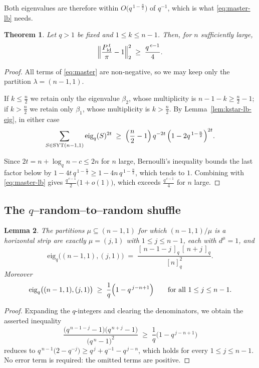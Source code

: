 \documentclass[11pt]{article}
\theoremstyle{plain}  %
\newtheorem{theorem}{Theorem}[section]
\newtheorem{lemma}[theorem]{Lemma}
\newcommand{\eig}{\text{eig}} %
\begin{document}
Both eigenvalues are therefore within $O\bigl(q^{\,1-\frac{n}{2}}\bigr)$ of $q^{-1}$, which is
what \eqref{eq:master-lb} needs.

\begin{theorem}\label{thm:kstar-lb}
Let $q>1$ be fixed and $1 \le k \le n-1$. Then, for $n$ sufficiently large,
$$
  \Bigl\|\frac{P^{\,t}_{\mathrm{id}}}{\pi}-1\Bigr\|_2^{2}
  \;\ge\; \frac{q^{\,c-1}}{4} .
$$
\end{theorem}



\begin{proof}
All terms of \eqref{eq:master} are non-negative, so we may keep only the
partition $\lambda = (n-1,1)$.

If $k \le \frac n2$ we retain only the eigenvalue $\beta_2$, whose
multiplicity is $n-1-k \ge \frac n2 - 1$; if $k > \frac n2$ we retain only
$\beta_1$, whose multiplicity is $k > \frac n2$. By
Lemma~\ref{lem:kstar-lb-eig}, in either case
$$
  \sum_{S \in \mathrm{SYT}(n-1,1)} \eig_q(S)^{2t}
  \;\ge\; \Bigl(\frac n2-1\Bigr)\,q^{-2t}\,
          \Bigl(1-2q^{\,1-\frac{n}{2}}\Bigr)^{2t} .
$$

Since $2t = n+\log_q n - c \le 2n$ for $n$ large, Bernoulli's inequality bounds the last
factor below by $1-4t\,q^{\,1-\frac{n}{2}} \ge 1-4n\,q^{\,1-\frac{n}{2}}$, which tends to $1$. Combining with \eqref{eq:master-lb} gives
$\frac{q^{\,c-1}}{2}\bigl(1+o(1)\bigr)$, which exceeds $\frac{q^{\,c-1}}{4}$
for $n$ large.
\end{proof}

\bigskip

\subsection{The \texorpdfstring{$q$--random--to--random}{q-random-to-random} shuffle}




\begin{lemma}\label{lem:r2r-eigs}
The partitions $\mu \subseteq (n-1,1)$ for which $(n-1,1)/\mu$ is a horizontal
strip are exactly $\mu = (j,1)$ with $1 \le j \le n-1$, each with
$d^{\mu} = 1$, and
$$
  \eig_q\bigl((n-1,1),(j,1)\bigr)
  \;=\; \frac{[\,n-1-j\,]_q\,[\,n+j\,]_q}{[n]_q^{2}} .
$$
Moreover
$$
  \eig_q\bigl((n-1,1),(j,1)\bigr) \;\ge\; \frac1q\Bigl(1-q^{\,j-n+1}\Bigr)
  \qquad\text{for all } 1 \le j \le n-1 .
$$
\end{lemma}



\begin{proof}
Expanding the $q$-integers and clearing the denominators, we obtain the asserted inequality
$$
  \frac{\bigl(q^{\,n-1-j}-1\bigr)\bigl(q^{\,n+j}-1\bigr)}
       {\bigl(q^{\,n}-1\bigr)^{2}}
  \;\ge\; \frac1q\bigl(1-q^{\,j-n+1}\bigr)
$$
reduces to $q^{\,n-1}\bigl(2-q^{-j}\bigr) \ge q^{\,j}+q^{-1}-q^{\,j-n}$, which
holds for every $1 \le j \le n-1$. No error term is required: the omitted
terms are positive.
\end{proof}
\end{document}
